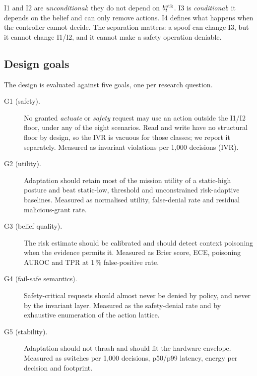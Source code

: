 I1 and I2 are \emph{unconditional}: they do not depend on $b^{\mathrm{atk}}_t$. I3 is
\emph{conditional}: it depends on the belief and can only remove actions. I4
defines what happens when the controller cannot decide. The separation matters:
a spoof can change I3, but it cannot change I1/I2, and it cannot make a safety
operation deniable.

\subsection{Design goals}
\label{sec:goals}

The design is evaluated against five goals, one per research question.

\begin{description}
  \item[G1 (safety).] No granted \emph{actuate} or \emph{safety} request may
  use an action outside the I1/I2 floor, under any of the eight scenarios.
  Read and write have no structural floor by design, so the IVR is vacuous for
  those classes; we report it separately. Measured as invariant violations per
  1{,}000 decisions (IVR).
  \item[G2 (utility).] Adaptation should retain most of the mission utility of a
  static-high posture and beat static-low, threshold and unconstrained
  risk-adaptive baselines. Measured as normalised utility, false-denial rate and
  residual malicious-grant rate.
  \item[G3 (belief quality).] The risk estimate should be calibrated and should
  detect context poisoning when the evidence permits it. Measured as Brier
  score, ECE, poisoning AUROC and TPR at 1\,\% false-positive rate.
  \item[G4 (fail-safe semantics).] Safety-critical requests should almost never
  be denied by policy, and never by the invariant layer. Measured as the
  safety-denial rate and by exhaustive enumeration of the action lattice.
  \item[G5 (stability).] Adaptation should not thrash and should fit the hardware
  envelope. Measured as switches per 1{,}000 decisions,
  p50/p99 latency, energy per decision and footprint.
\end{description}
